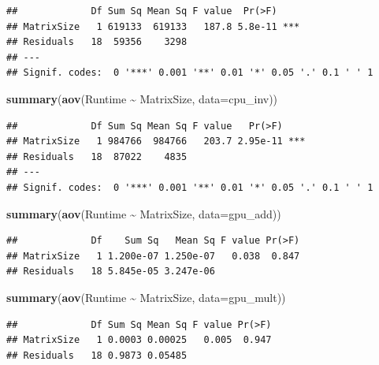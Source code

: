 \documentclass[
]{article}
\newenvironment{Shaded}{\begin{snugshade}}{\end{snugshade}}
\newcommand{\DataTypeTok}[1]{\textcolor[rgb]{0.13,0.29,0.53}{#1}}
\newcommand{\KeywordTok}[1]{\textcolor[rgb]{0.13,0.29,0.53}{\textbf{#1}}}
\newcommand{\NormalTok}[1]{#1}
\newcommand{\OperatorTok}[1]{\textcolor[rgb]{0.81,0.36,0.00}{\textbf{#1}}}
\newcommand{\StringTok}[1]{\textcolor[rgb]{0.31,0.60,0.02}{#1}}
\begin{document}
\begin{verbatim}
##             Df Sum Sq Mean Sq F value  Pr(>F)    
## MatrixSize   1 619133  619133   187.8 5.8e-11 ***
## Residuals   18  59356    3298                    
## ---
## Signif. codes:  0 '***' 0.001 '**' 0.01 '*' 0.05 '.' 0.1 ' ' 1
\end{verbatim}

\begin{Shaded}
\begin{Highlighting}[]
\KeywordTok{summary}\NormalTok{(}\KeywordTok{aov}\NormalTok{(Runtime }\OperatorTok{\textasciitilde{}}\StringTok{ }\NormalTok{MatrixSize, }\DataTypeTok{data=}\NormalTok{cpu\_inv))}
\end{Highlighting}
\end{Shaded}

\begin{verbatim}
##             Df Sum Sq Mean Sq F value   Pr(>F)    
## MatrixSize   1 984766  984766   203.7 2.95e-11 ***
## Residuals   18  87022    4835                     
## ---
## Signif. codes:  0 '***' 0.001 '**' 0.01 '*' 0.05 '.' 0.1 ' ' 1
\end{verbatim}

\begin{Shaded}
\begin{Highlighting}[]
\KeywordTok{summary}\NormalTok{(}\KeywordTok{aov}\NormalTok{(Runtime }\OperatorTok{\textasciitilde{}}\StringTok{ }\NormalTok{MatrixSize, }\DataTypeTok{data=}\NormalTok{gpu\_add))}
\end{Highlighting}
\end{Shaded}

\begin{verbatim}
##             Df    Sum Sq   Mean Sq F value Pr(>F)
## MatrixSize   1 1.200e-07 1.250e-07   0.038  0.847
## Residuals   18 5.845e-05 3.247e-06
\end{verbatim}

\begin{Shaded}
\begin{Highlighting}[]
\KeywordTok{summary}\NormalTok{(}\KeywordTok{aov}\NormalTok{(Runtime }\OperatorTok{\textasciitilde{}}\StringTok{ }\NormalTok{MatrixSize, }\DataTypeTok{data=}\NormalTok{gpu\_mult))}
\end{Highlighting}
\end{Shaded}

\begin{verbatim}
##             Df Sum Sq Mean Sq F value Pr(>F)
## MatrixSize   1 0.0003 0.00025   0.005  0.947
## Residuals   18 0.9873 0.05485
\end{verbatim}
\end{document}
